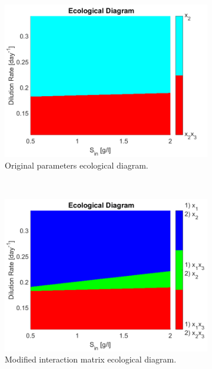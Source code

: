 \documentclass[3p,times]{article}
\begin{document}
\begin{figure}[ht]
	\centering
	\begin{subfigure}[b]{0.32\textwidth}
	\includegraphics[width=\textwidth]{Stability/ED_parameters_Dumont}
	\caption{Original parameters ecological diagram.}
	\label{ED 1}
	\end{subfigure}
~
	\begin{subfigure}[b]{0.32\textwidth}
	\includegraphics[width=\textwidth]{Stability/ED_parameters_modified}
	\caption{Modified interaction matrix ecological diagram.}
	\label{ED 2}
	\end{subfigure}
~
\begin{subfigure}[b]{0.32\textwidth}

\end{subfigure}
\end{figure}
\end{document}
